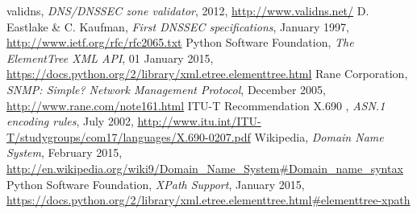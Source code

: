 \begin{thebibliography}{99}
 validns, {\em DNS/DNSSEC zone validator}, 2012, \url{http://www.validns.net/}
 D. Eastlake \& C. Kaufman, {\em First DNSSEC specifications}, January 1997, \url{http://www.ietf.org/rfc/rfc2065.txt}
 Python Software Foundation, {\em The ElementTree XML API}, 01 January 2015, \url{https://docs.python.org/2/library/xml.etree.elementtree.html}
 Rane Corporation, {\em SNMP: Simple? Network Management Protocol}, December  2005, \url{http://www.rane.com/note161.html}
 ITU-T Recommendation X.690 , {\em ASN.1 encoding rules}, July 2002, \url{http://www.itu.int/ITU-T/studygroups/com17/languages/X.690-0207.pdf}
 Wikipedia, {\em Domain Name System}, February  2015, \url{http://en.wikipedia.org/wiki9/Domain_Name_System#Domain_name_syntax}
 Python Software Foundation, {\em XPath Support}, January  2015, \url{https://docs.python.org/2/library/xml.etree.elementtree.html#elementtree-xpath}
\end{thebibliography}